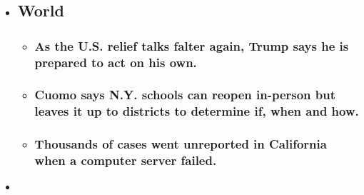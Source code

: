 \begin{itemize}
\item
  \href{https://www.nytimes.com/2020/08/07/world/covid-19-news.html?type=styln-live-updates\&label=world\&index=0}{}

  \hypertarget{world}{%
  \subsection{World}\label{world}}

  \begin{itemize}
  \item
    \href{https://www.nytimes.com/2020/08/07/world/covid-19-news.html?type=styln-live-updates\&label=world\&index=0\#link-1f86d03a}{}

    \hypertarget{as-the-us-relief-talks-falter-again-trump-says-he-is-prepared-to-act-on-his-own}{%
    \subsubsection{As the U.S. relief talks falter again, Trump says he
    is prepared to act on his
    own.}\label{as-the-us-relief-talks-falter-again-trump-says-he-is-prepared-to-act-on-his-own}}
  \item
    \href{https://www.nytimes.com/2020/08/07/world/covid-19-news.html?type=styln-live-updates\&label=world\&index=0\#link-3f64a70a}{}

    \hypertarget{cuomo-says-ny-schools-can-reopen-in-person-but-leaves-it-up-to-districts-to-determine-if-when-and-how}{%
    \subsubsection{Cuomo says N.Y. schools can reopen in-person but
    leaves it up to districts to determine if, when and
    how.}\label{cuomo-says-ny-schools-can-reopen-in-person-but-leaves-it-up-to-districts-to-determine-if-when-and-how}}
  \item
    \href{https://www.nytimes.com/2020/08/07/world/covid-19-news.html?type=styln-live-updates\&label=world\&index=0\#link-14e70066}{}

    \hypertarget{thousands-of-cases-went-unreported-in-california-when-a-computer-server-failed}{%
    \subsubsection{Thousands of cases went unreported in California when
    a computer server
    failed.}\label{thousands-of-cases-went-unreported-in-california-when-a-computer-server-failed}}
  \end{itemize}
\item
  \href{https://www.nytimes.com/live/2020/08/07/business/stock-market-today-coronavirus?type=styln-live-updates\&label=business\&index=1}{}


\end{itemize}
